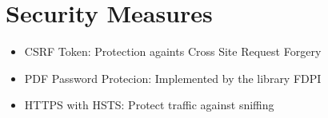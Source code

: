 \chapter{Security Measures}
\begin{itemize}
	\item CSRF Token: Protection againts Cross Site Request Forgery
	\item PDF Password Protecion: Implemented by the library FDPI
	\item HTTPS with HSTS: Protect traffic against sniffing
\end{itemize}
